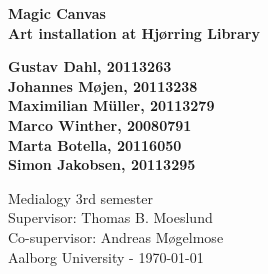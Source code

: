 \thispagestyle{empty} %
\hspace{6cm} \vspace{6cm}
\begin{center}
\textbf{\Huge {Magic Canvas}\\ \vspace{1cm}
\huge{Art installation at Hj{\o}rring Library}}
\end{center}
\vspace{1cm}
\begin{center}
\Large{\textbf{Gustav Dahl, 20113263 \\ Johannes M{\o}jen, 20113238
\\ Maximilian M\"uller, 20113279 \\ Marco Winther, 20080791 \\ Marta Botella, 20116050
\\ Simon Jakobsen, 20113295}}
\end{center}
\vfill
Medialogy 3rd semester\\
Supervisor: Thomas B. Moeslund\\
Co-supervisor: Andreas M{\o}gelmose\\
Aalborg University - \today
\thispagestyle{empty}
\setcounter{page}{0}